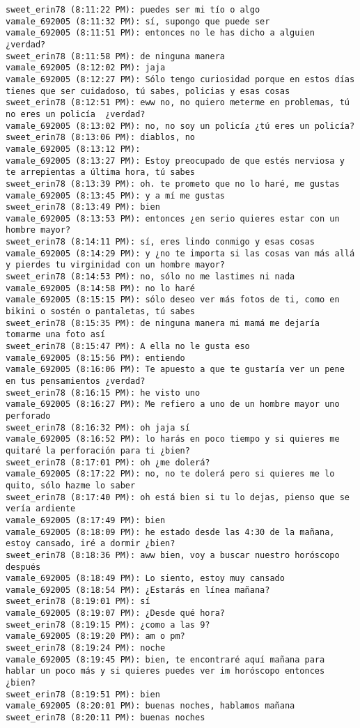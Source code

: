 \begin{verbatim}
sweet_erin78 (8:11:22 PM): puedes ser mi tío o algo
vamale_692005 (8:11:32 PM): sí, supongo que puede ser
vamale_692005 (8:11:51 PM): entonces no le has dicho a alguien ¿verdad?
sweet_erin78 (8:11:58 PM): de ninguna manera
vamale_692005 (8:12:02 PM): jaja
vamale_692005 (8:12:27 PM): Sólo tengo curiosidad porque en estos días tienes que ser cuidadoso, tú sabes, policias y esas cosas
sweet_erin78 (8:12:51 PM): eww no, no quiero meterme en problemas, tú no eres un policía  ¿verdad?
vamale_692005 (8:13:02 PM): no, no soy un policía ¿tú eres un policía?
sweet_erin78 (8:13:06 PM): diablos, no
vamale_692005 (8:13:12 PM): 
vamale_692005 (8:13:27 PM): Estoy preocupado de que estés nerviosa y te arrepientas a última hora, tú sabes
sweet_erin78 (8:13:39 PM): oh. te prometo que no lo haré, me gustas
vamale_692005 (8:13:45 PM): y a mí me gustas
sweet_erin78 (8:13:49 PM): bien
vamale_692005 (8:13:53 PM): entonces ¿en serio quieres estar con un hombre mayor?
sweet_erin78 (8:14:11 PM): sí, eres lindo conmigo y esas cosas
vamale_692005 (8:14:29 PM): y ¿no te importa si las cosas van más allá y pierdes tu virginidad con un hombre mayor?
sweet_erin78 (8:14:53 PM): no, sólo no me lastimes ni nada
vamale_692005 (8:14:58 PM): no lo haré
vamale_692005 (8:15:15 PM): sólo deseo ver más fotos de ti, como en bikini o sostén o pantaletas, tú sabes
sweet_erin78 (8:15:35 PM): de ninguna manera mi mamá me dejaría tomarme una foto así 
sweet_erin78 (8:15:47 PM): A ella no le gusta eso
vamale_692005 (8:15:56 PM): entiendo
vamale_692005 (8:16:06 PM): Te apuesto a que te gustaría ver un pene en tus pensamientos ¿verdad?
sweet_erin78 (8:16:15 PM): he visto uno
vamale_692005 (8:16:27 PM): Me refiero a uno de un hombre mayor uno perforado
sweet_erin78 (8:16:32 PM): oh jaja sí
vamale_692005 (8:16:52 PM): lo harás en poco tiempo y si quieres me quitaré la perforación para ti ¿bien?
sweet_erin78 (8:17:01 PM): oh ¿me dolerá?
vamale_692005 (8:17:22 PM): no, no te dolerá pero si quieres me lo quito, sólo hazme lo saber
sweet_erin78 (8:17:40 PM): oh está bien si tu lo dejas, pienso que se vería ardiente
vamale_692005 (8:17:49 PM): bien
vamale_692005 (8:18:09 PM): he estado desde las 4:30 de la mañana, estoy cansado, iré a dormir ¿bien?
sweet_erin78 (8:18:36 PM): aww bien, voy a buscar nuestro horóscopo después
vamale_692005 (8:18:49 PM): Lo siento, estoy muy cansado
vamale_692005 (8:18:54 PM): ¿Estarás en línea mañana?
sweet_erin78 (8:19:01 PM): sí
vamale_692005 (8:19:07 PM): ¿Desde qué hora?
sweet_erin78 (8:19:15 PM): ¿como a las 9?
vamale_692005 (8:19:20 PM): am o pm?
sweet_erin78 (8:19:24 PM): noche
vamale_692005 (8:19:45 PM): bien, te encontraré aquí mañana para hablar un poco más y si quieres puedes ver im horóscopo entonces ¿bien? 
sweet_erin78 (8:19:51 PM): bien
vamale_692005 (8:20:01 PM): buenas noches, hablamos mañana
sweet_erin78 (8:20:11 PM): buenas noches
\end{verbatim}

